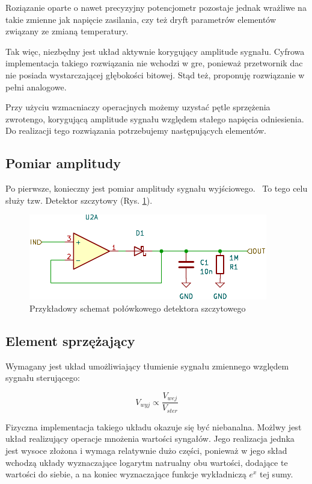 \documentclass[12pt, a4paper]{article}
\begin{document}
Roziązanie oparte o nawet precyzyjny potencjometr pozostaje jednak wrażliwe na takie zmienne jak napięcie zasilania, 
czy też dryft parametrów elementów związany ze zmianą temperatury.

Tak więc, niezbędny jest układ aktywnie korygujący amplitude sygnału.
Cyfrowa implementacja takiego rozwiązania nie wchodzi w gre, 
ponieważ przetwornik \Ac{dac} nie posiada wystarczającej głębokości bitowej. 
Stąd też, proponuję rozwiązanie w pełni analogowe.

Przy użyciu wzmacniaczy operacjnych możemy uzystać pętle sprzężenia zwrotengo, 
korygującą amplitude sygnału względem stałego napięcia odniesienia.
Do realizacji tego rozwiązania potrzebujemy następujących elementów.

\subsection{Pomiar amplitudy}

Po pierwsze, konieczny jest pomiar amplitudy sygnału wyjściowego. \
To tego celu służy tzw. Detektor szczytowy (Rys. \ref{fig:peak-detector-schematic}). 

\begin{figure}[h]
	\centering
	\includegraphics{img/peak_detector.pdf}
	\caption{Przykładowy schemat połówkowego detektora szczytowego}
	\label{fig:peak-detector-schematic}
\end{figure}

\subsection{Element sprzężający}
Wymagany jest układ umożliwiający tłumienie sygnału zmiennego względem sygnału sterującego:

\begin{equation}
	V_{wyj} \propto \frac{V_{wej}}{V_{ster}}
	\label{eq:coupling_1}
\end{equation}

Fizyczna implementacja takiego układu okazuje się być niebanalna.
Możlwy jest układ realizujący operacje mnożenia wartości syngałów. 
Jego realizacja jednka jest wysoce złożona i wymaga relatywnie dużo części, 
ponieważ w jego skład wchodzą układy wyznaczające logarytm natrualny obu wartości, dodające te wartości do siebie,
a na koniec wyznaczające funkcje wykładniczą $e^x$ tej sumy.
\end{document}
